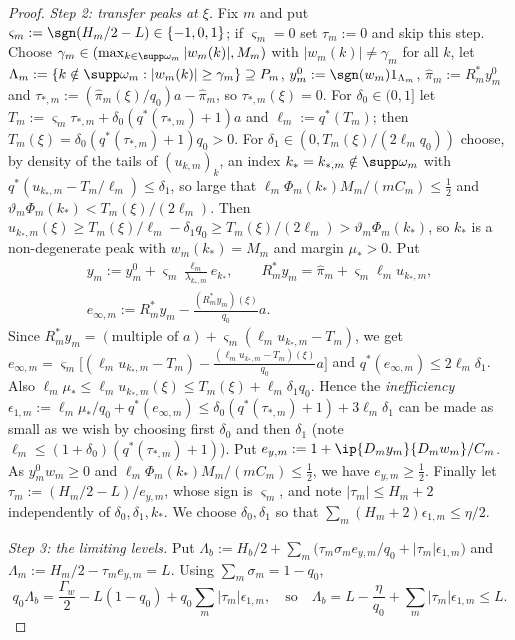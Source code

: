\begin{proof}
\emph{Step 2: transfer peaks at $\xi$.}  Fix $m$ and put
$\varsigma_m:=\sgn(H_m/2-L)\in\{-1,0,1\}$; if $\varsigma_m=0$ set
$\tau_m:=0$ and skip this step.  Choose $\gamma_m\in(\max_{k\in\supp\omega_m}
|w_m(k)|,M_m)$ with $|w_m(k)|\ne\gamma_m$ for all $k$, let
$\Lambda_m:=\{k\notin\supp\omega_m:|w_m(k)|\ge\gamma_m\}\supseteq P_m$,
$y^0_m:=\sgn(w_m)1_{\Lambda_m}$, $\hat\pi_m:=R_m^*y^0_m$ and
$\tau_{*,m}:=(\hat\pi_m(\xi)/q_0)a-\hat\pi_m$, so $\tau_{*,m}(\xi)=0$.  For
$\delta_0\in(0,1]$ let $T_m:=\varsigma_m\tau_{*,m}+\delta_0(q^*(\tau_{*,m})+1)
a$ and $\ell_m:=q^*(T_m)$; then $T_m(\xi)=\delta_0(q^*(\tau_{*,m})+1)q_0>0$.
For $\delta_1\in(0,T_m(\xi)/(2\ell_mq_0))$ choose, by density of the tails
of $(u_{k,m})_k$, an index $k_*=k_{*,m}\notin\supp\omega_m$ with
$q^*(u_{k_*,m}-T_m/\ell_m)\le\delta_1$, so large that $\ell_m\Phi_m(k_*)
M_m/(mC_m)\le\frac12$ and $\vartheta_m\Phi_m(k_*)<T_m(\xi)/(2\ell_m)$.  Then
$u_{k_*,m}(\xi)\ge T_m(\xi)/\ell_m-\delta_1q_0\ge T_m(\xi)/(2\ell_m)>
\vartheta_m\Phi_m(k_*)$, so $k_*$ is a non-degenerate peak with
$w_m(k_*)=M_m$ and margin $\mu_*>0$.  Put
\begin{gather*}
 y_m:=y^0_m+\varsigma_m\frac{\ell_m}{\lambda_{k_*,m}}e_{k_*},\qquad
 R_m^*y_m=\hat\pi_m+\varsigma_m\ell_mu_{k_*,m},\\
 e_{\infty,m}:=R_m^*y_m-\frac{(R_m^*y_m)(\xi)}{q_0}a .
\end{gather*}
Since $R_m^*y_m=(\text{multiple of }a)+\varsigma_m(\ell_mu_{k_*,m}-T_m)$, we get
$e_{\infty,m}=\varsigma_m\big[(\ell_mu_{k_*,m}-T_m)-\frac{(\ell_mu_{k_*,m}-
T_m)(\xi)}{q_0}a\big]$ and $q^*(e_{\infty,m})\le2\ell_m\delta_1$.  Also
$\ell_m\mu_*\le\ell_mu_{k_*,m}(\xi)\le T_m(\xi)+\ell_m\delta_1q_0$.  Hence the
\emph{inefficiency} $\epsilon_{1,m}:=\ell_m\mu_*/q_0+q^*(e_{\infty,m})\le
\delta_0(q^*(\tau_{*,m})+1)+3\ell_m\delta_1$ can be made as small as we
wish by choosing first $\delta_0$ and then $\delta_1$ (note $\ell_m\le
(1+\delta_0)(q^*(\tau_{*,m})+1)$).  Put
$e_{y,m}:=1+\ip{D_my_m}{D_mw_m}/C_m$.  As $y^0_mw_m\ge0$ and
$\ell_m\Phi_m(k_*)M_m/(mC_m)\le\frac12$, we have $e_{y,m}\ge\frac12$.
Finally let $\tau_m:=(H_m/2-L)/e_{y,m}$, whose sign is $\varsigma_m$, and
note $|\tau_m|\le H_m+2$ independently of $\delta_0,\delta_1,k_*$.  We
choose $\delta_0,\delta_1$ so that $\sum_m(H_m+2)\epsilon_{1,m}\le\eta/2$.

\emph{Step 3: the limiting levels.}  Put
$\Lambda_b:=H_b/2+\sum_m\big(\tau_m\sigma_me_{y,m}/q_0+|\tau_m|
\epsilon_{1,m}\big)$ and $\Lambda_m:=H_m/2-\tau_me_{y,m}=L$.  Using
$\sum_m\sigma_m=1-q_0$,
\[
 q_0\Lambda_b=\frac{\Gamma_w}2-L(1-q_0)+q_0\sum_m|\tau_m|\epsilon_{1,m},
 \quad\text{so}\quad
 \Lambda_b=L-\frac\eta{q_0}+\sum_m|\tau_m|\epsilon_{1,m}\le L .
\]


\end{proof}
